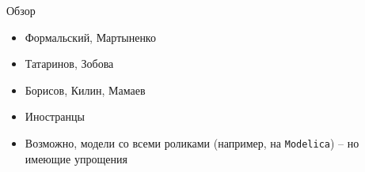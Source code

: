 \begin{frame}{Обзор}
    \begin{itemize}
        \item Формальский, Мартыненко
        \item Татаринов, Зобова
        \item Борисов, Килин, Мамаев
        \item Иностранцы
        \item Возможно, модели со всеми роликами (например, на \texttt{Modelica}) -- но имеющие упрощения
    \end{itemize}
\end{frame}
